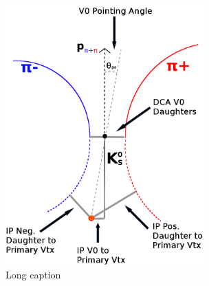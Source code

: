 \begin{figure}[h]
\begin{minipage}{18pc}
\includegraphics[width=18pc]{3_DataSelection/Figures/K0Cuts.png}
\end{minipage} 
\caption[Short Caption]{\label{fig:MomResLL} Long caption}
\end{figure}




